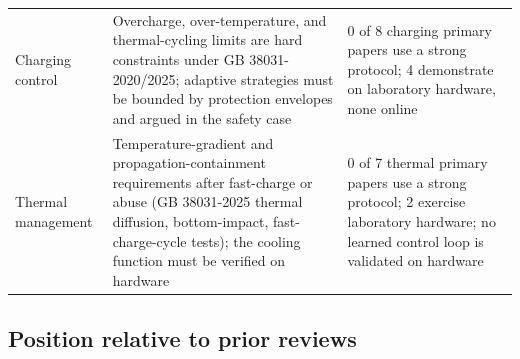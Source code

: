 \documentclass[journal]{IEEEtran}
\begin{document}
\begin{table}[!t]
\begin{tabular}{|p{0.70in}|p{2.97in}|p{2.97in}|}
Charging control & Overcharge, over-temperature, and thermal-cycling limits are hard constraints under GB 38031-2020/2025; adaptive strategies must be bounded by protection envelopes and argued in the safety case & 0 of 8 charging primary papers use a strong protocol; 4 demonstrate on laboratory hardware, none online \\
Thermal management & Temperature-gradient and propagation-containment requirements after fast-charge or abuse (GB 38031-2025 thermal diffusion, bottom-impact, fast-charge-cycle tests); the cooling function must be verified on hardware & 0 of 7 thermal primary papers use a strong protocol; 2 exercise laboratory hardware; no learned control loop is validated on hardware \\
\hline
\end{tabular}
\end{table}

\subsection{Position relative to prior reviews}
\end{document}
